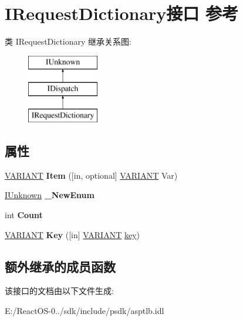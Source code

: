 \hypertarget{interface_i_request_dictionary}{}\section{I\+Request\+Dictionary接口 参考}
\label{interface_i_request_dictionary}
类 I\+Request\+Dictionary 继承关系图\+:\begin{figure}[H]
\begin{center}
\leavevmode
\includegraphics[height=3.000000cm]{interface_i_request_dictionary}
\end{center}
\end{figure}
\subsection*{属性}
\begin{DoxyCompactItemize}
\item 
\mbox{\label{interface_i_request_dictionary_afd1f9a6d4b1b83d20457a63e46016e9d}} 
\hyperlink{structtag_v_a_r_i_a_n_t}{V\+A\+R\+I\+A\+NT} {\bfseries Item} (\mbox{[}in, optional\mbox{]} \hyperlink{structtag_v_a_r_i_a_n_t}{V\+A\+R\+I\+A\+NT} Var)
\item 
\mbox{\label{interface_i_request_dictionary_ab735d8ed8374960390d0915636c351d8}} 
\hyperlink{interface_i_unknown}{I\+Unknown} {\bfseries \+\_\+\+New\+Enum}
\item 
\mbox{\label{interface_i_request_dictionary_a3bf1e02d73d1d6bf846a758c56fc8811}} 
int {\bfseries Count}
\item 
\mbox{\label{interface_i_request_dictionary_a72d5480e8441f710a747c2916729d3e9}} 
\hyperlink{structtag_v_a_r_i_a_n_t}{V\+A\+R\+I\+A\+NT} {\bfseries Key} (\mbox{[}in\mbox{]} \hyperlink{structtag_v_a_r_i_a_n_t}{V\+A\+R\+I\+A\+NT} \hyperlink{structkey}{key})
\end{DoxyCompactItemize}
\subsection*{额外继承的成员函数}


该接口的文档由以下文件生成\+:\begin{DoxyCompactItemize}
\item 
E\+:/\+React\+O\+S-\/0../sdk/include/psdk/asptlb.\+idl\end{DoxyCompactItemize}
